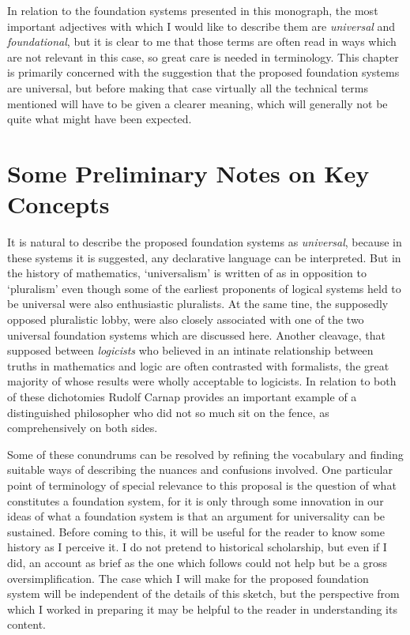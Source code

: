 In relation to the foundation systems presented in this monograph, the most important adjectives with which I would like to describe them are \emph{universal} and \emph{foundational}, but it is clear to me that those terms are often read in ways which are not relevant in this case, so great care is needed in terminology.
This chapter is primarily concerned with the suggestion that the proposed foundation systems are universal, but before making that case virtually all the technical terms mentioned will have to be given a clearer meaning, which will generally not be quite what might have been expected.

\section{Some Preliminary Notes on Key Concepts}

It is natural to describe the proposed foundation systems as \emph{universal}, because in these systems it is suggested, any declarative language can be interpreted.
But in the history of mathematics, `universalism' is written of as in opposition to `pluralism' even though some of the earliest proponents of logical systems held to be universal were also enthusiastic pluralists.
At the same tine, the supposedly opposed pluralistic lobby, were also closely associated with one of the two universal foundation systems which are discussed here.
Another cleavage, that supposed between \emph{logicists} who believed in an intinate relationship between truths in mathematics and logic are often contrasted with formalists, the great majority of whose results were wholly acceptable to logicists.
In relation to both of these dichotomies Rudolf Carnap provides an important example of a distinguished philosopher who did not so much sit on the fence, as comprehensively on both sides.

Some of these conundrums can be resolved by refining the vocabulary and finding suitable ways of describing the nuances and confusions involved.
One particular point of terminology of special relevance to this proposal is the question of what constitutes a foundation system, for it is only through some innovation in our ideas of what a foundation system is that an argument for universality can be sustained.
Before coming to this, it will be useful for the reader to know some history as I perceive it.
I do not pretend to historical scholarship, but even if I did, an account as brief as the one which follows could not help but be a gross oversimplification.
The case which I will make for the proposed foundation system will be independent of the details of this sketch, but the perspective from which I worked in preparing it may be helpful to the reader in understanding its content.

